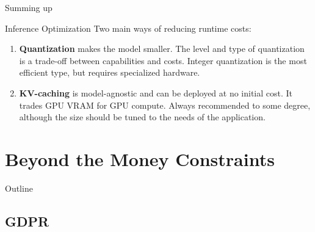 \documentclass[24pt]{beamer}
\newcommand{\sectionslide}{
	\begin{frame}{Outline}
		\tableofcontents[currentsection]
\end{frame}
}
\newcommand{\subsectionslide}{
	 \begin{frame}
		\sectionpage
		\subsectionpage
	\end{frame}
}
\begin{document}
\begin{frame}{Summing up}
	\begin{block}{Inference Optimization}
		Two main ways of reducing runtime costs:
		\begin{enumerate}
			\item \textbf{Quantization} makes the model smaller. The level and type of quantization is a trade-off between capabilities and costs. Integer quantization is the most efficient type, but requires specialized hardware.
			\item \textbf{KV-caching} is model-agnostic and can be deployed at no initial cost. It trades GPU VRAM for GPU compute. Always recommended to some degree, although the size should be tuned to the needs of the application.
		\end{enumerate}
	\end{block}
\end{frame}


\section{Beyond the Money Constraints}
\sectionslide

\subsection{GDPR}
\subsectionslide
\end{document}
